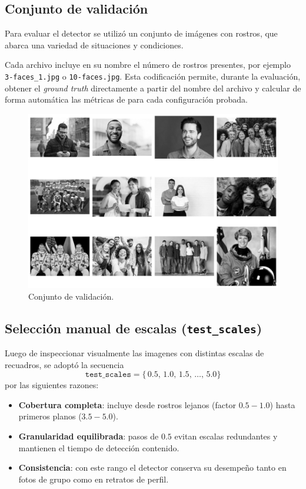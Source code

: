 \documentclass{article}
\begin{document}
\subsection*{Conjunto de validación}

Para evaluar el detector se utilizó un conjunto de imágenes con rostros, que abarca una variedad de situaciones y condiciones. 

Cada archivo incluye en su nombre el número de rostros presentes, por ejemplo \verb|3-faces_1.jpg| o \verb|10-faces.jpg|.
Esta codificación permite, durante la evaluación, obtener el \emph{ground
truth} directamente a partir del nombre del archivo y calcular de forma
automática las métricas de para cada configuración probada.

\begin{figure}[H]
  \centering
  \includegraphics[width=0.65\linewidth]{tarea_6/imagenes/dataset.png}
  \caption{Conjunto de validación.}
  \label{fig:dataset}
\end{figure}

\subsection*{Selección manual de escalas (\texttt{test\_scales})}

Luego de inspeccionar visualmente las imagenes con distintas escalas de recuadros, se adoptó la secuencia
\[
\texttt{test\_scales} = \{\,0.5,\,1.0,\,1.5,\,\dots,\,5.0\}
\]
por las siguientes razones:

\begin{itemize}
    \item \textbf{Cobertura completa}: incluye desde rostros lejanos
          (factor \(0.5{-}1.0\)) hasta primeros planos
          (\(3.5{-}5.0\)).
    \item \textbf{Granularidad equilibrada}: pasos de \(0.5\) evitan
          escalas redundantes y mantienen el tiempo de detección contenido.
    \item \textbf{Consistencia}: con este rango el detector conserva su
          desempeño tanto en fotos de grupo como en retratos de perfil.
\end{itemize}
\end{document}
